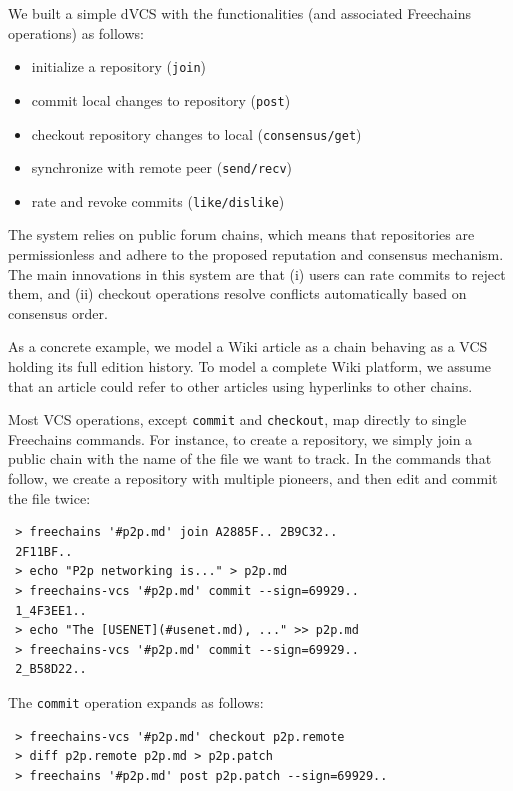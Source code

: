 \documentclass[12pt]{article}
\newcommand{\FC}       {Freechains\xspace}
\newcommand{\code}[1]  {\texttt{\footnotesize{#1}}}
\begin{document}
We built a simple dVCS with the functionalities (and associated \FC
operations) as follows:
%
\begin{itemize}
    \setlength{\itemindent}{-8pt}
    \item initialize a repository (\code{join})
    \item commit local changes to repository (\code{post})
    \item checkout repository changes to local (\code{consensus/get})
    \item synchronize with remote peer (\code{send/recv})
    \item rate and revoke commits (\code{like/dislike})
\end{itemize}
%
The system relies on public forum chains, which means that repositories are
permissionless and adhere to the proposed reputation and consensus mechanism.
The main innovations in this system are that
    (i)  users can rate commits to reject them, and
    (ii) checkout operations resolve conflicts automatically based on consensus
         order.

As a concrete example, we model a Wiki article as a chain behaving as a VCS
holding its full edition history.
To model a complete Wiki platform, we assume that an article could refer to
other articles using hyperlinks to other chains.

Most VCS operations, except \code{commit} and \code{checkout}, map directly to
single \FC commands.
For instance, to create a repository, we simply join a public chain with the
name of the file we want to track.
In the commands that follow, we create a repository with multiple pioneers, and
then edit and commit the file twice:

{\footnotesize
\begin{verbatim}
 > freechains '#p2p.md' join A2885F.. 2B9C32..
 2F11BF..
 > echo "P2p networking is..." > p2p.md
 > freechains-vcs '#p2p.md' commit --sign=69929..
 1_4F3EE1..
 > echo "The [USENET](#usenet.md), ..." >> p2p.md
 > freechains-vcs '#p2p.md' commit --sign=69929..
 2_B58D22..
\end{verbatim}
}

The \code{commit} operation expands as follows:

{\footnotesize
\begin{verbatim}
 > freechains-vcs '#p2p.md' checkout p2p.remote
 > diff p2p.remote p2p.md > p2p.patch
 > freechains '#p2p.md' post p2p.patch --sign=69929..
\end{verbatim}
}
\end{document}
